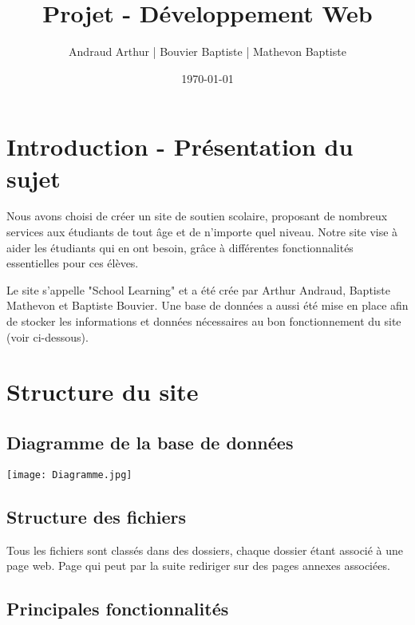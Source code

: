 \documentclass[12pt,a4paper]{article}
\title{Projet - Développement Web}
\author{Andraud Arthur | Bouvier Baptiste | Mathevon Baptiste}
\date{\today}
\begin{document}
\maketitle

\newpage

\tableofcontents

\section{Introduction - Présentation du sujet}

Nous avons choisi de créer un site de soutien scolaire, proposant de nombreux services aux étudiants de tout âge et de n'importe quel niveau. Notre site vise à aider les étudiants qui en ont besoin, grâce à différentes fonctionnalités essentielles pour ces élèves.


Le site s'appelle "School Learning" et a été crée par Arthur Andraud, Baptiste Mathevon et Baptiste Bouvier. Une base de données a aussi été mise en place afin de stocker les informations et données nécessaires au bon fonctionnement du site (voir ci-dessous).

\section{Structure du site}

\subsection{Diagramme de la base de données}

\begin{center}
  \texttt{[image: Diagramme.jpg]}
\end{center}

\subsection{Structure des fichiers}

Tous les fichiers sont classés dans des dossiers, chaque dossier étant associé à une page web.
Page qui peut par la suite rediriger sur des pages annexes associées.

\subsection{Principales fonctionnalités}
\end{document}
